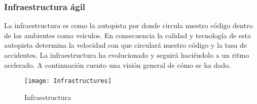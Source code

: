 \subsubsection{Infraestructura ágil}
La infraestructura es como la autopista por donde circula nuestro código dentro de los ambientes como veículos. En consecuencia la calidad y tecnología de esta autopista determina la velocidad con que circulará nuestro código y la tasa de accidentes. La infraestructura ha evolucionado y seguirá haciéndolo a un ritmo acelerado. A continuación cuento una visión general de cómo se ha dado. 


\begin{figure}[h]
  \centering
  \texttt{[image: Infrastructures]}
  \caption{Infraestructura}
  \centering
  \label{fig:Infrastructures} %
\end{figure}
\FloatBarrier %

